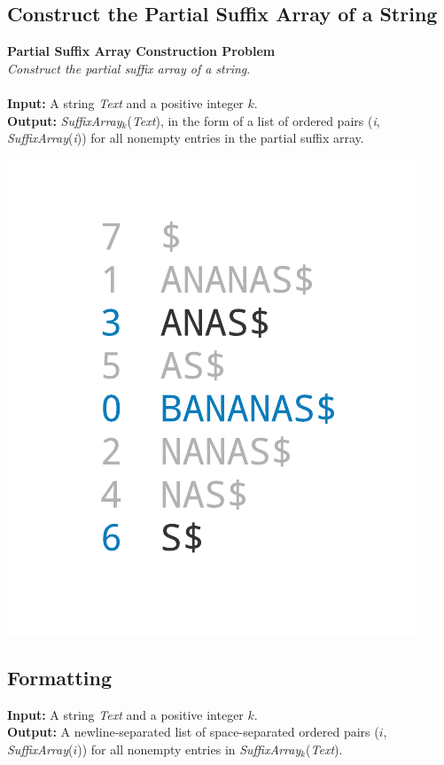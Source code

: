 \documentclass{article}
\begin{document}
\subsection{Construct the Partial Suffix Array of a String}
\hline\vspace{5}
\noindent \textbf{Partial Suffix Array Construction Problem}\\
\emph{Construct the partial suffix array of a string}.\\ \\
\textbf{Input:} A string \emph{Text} and a positive integer $k$.\\
\textbf{Output:} \emph{SuffixArray}$_k$(\emph{Text}), in the form of a list of ordered pairs (\emph{i}, \emph{SuffixArray}(\emph{i})) for all nonempty entries in the partial suffix array.
\begin{center}
    \includegraphics[scale=0.2]{logos/9Q.png} 
\end{center}
\hline\vspace{5}

\subsection*{Formatting}
\textbf{Input:} A string \emph{Text} and a positive integer $k$.\\
\noindent \textbf{Output:} A newline-separated list of space-separated ordered pairs ($i$, \emph{SuffixArray}($i$)) for all nonempty entries in \emph{SuffixArray}$_k$(\emph{Text}).
\end{document}

